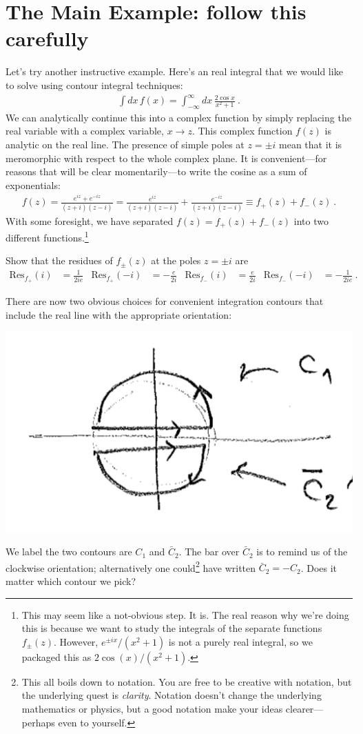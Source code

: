 \section{The Main Example: follow this carefully}
Let's try another instructive example. Here's an real integral that we would like to solve using contour integral techniques:
\begin{align}
\int dx\, f(x) = \int_{-\infty}^\infty  dx\,
\frac{2\cos x}{x^2+1} \ .
\end{align}
We can analytically continue this into a complex function by simply replacing the real variable with a complex variable, $x\to z$. This complex function $f(z)$ is analytic on the real line. The presence of simple poles at $z=\pm i$ mean that it is meromorphic with respect to the whole complex plane. It is convenient---for reasons that will be clear momentarily---to write the cosine as a sum of exponentials:
\begin{align}
  f(z) 
  = \frac{e^{iz}+e^{-iz}}{(z+i)(z-i)} 
  = \frac{e^{iz}}{(z+i)(z-i)} + \frac{e^{-iz}}{(z+i)(z-i)} 
  \equiv f_+(z) + f_-(z)
  \ .
\end{align}
With some foresight, we have separated $f(z)=f_+(z)+f_-(z)$ into two different functions.\footnote{This may seem like a not-obvious step. It is. The real reason why we're doing this is because we want to study the integrals of the separate functions $f_\pm(z)$. However, $e^{\pm ix}/(x^2+1)$ is not a purely real integral, so we packaged this as $2\cos(x)/(x^2+1)$.}

\begin{exercise}
Show that the residues of $f_\pm(z)$ at the poles $z=\pm i$ are
\begin{align}
  \text{Res}_{f_+}(i) &= \frac{1}{2ie}
  &
  \text{Res}_{f_+}(-i) &= -\frac{e}{2i}
  &
  \text{Res}_{f_-}(i) &= \frac{e}{2i}
  &
  \text{Res}_{f_-}(-i) &= -\frac{1}{2ie} \ .
\end{align}

\end{exercise}

There are now two obvious choices for convenient integration contours that include the real line with the appropriate orientation:
\begin{center}
\includegraphics[width=.5\textwidth]{figures/Lec_2017_14_whichcontour.png}
\end{center}
We label the two contours are $C_1$ and $\bar C_2$. The bar over $\bar C_2$ is to remind us of the clockwise orientation; alternatively one could\footnote{This all boils down to notation. You are free to be creative with notation, but the underlying quest is \emph{clarity}. Notation doesn't change the underlying mathematics or physics, but a good notation make your ideas clearer---perhaps even to yourself.} have written $\bar C_2 = -C_2$.  Does it matter which contour we pick?

